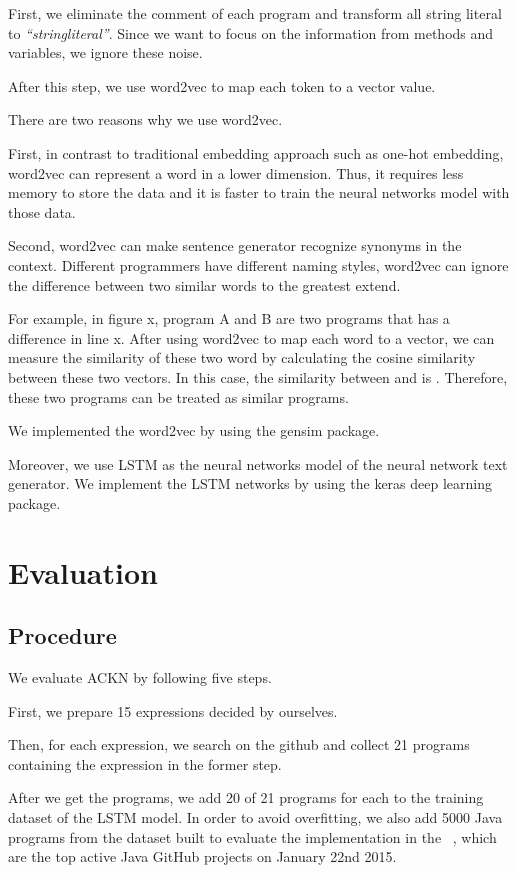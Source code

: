 \documentclass[PRO,english]{ipsj}
\begin{document}
First, we eliminate the comment of each program and transform all string literal to \textit{``stringliteral''}. Since we want to focus on the information from methods and variables, we ignore these noise.

After this step, we use word2vec to map each token to a vector value. 

There are two reasons why we use word2vec. 

First, in contrast to traditional embedding approach such as one-hot embedding, word2vec can represent a word in a lower dimension. Thus, it requires less memory to store the data and it is faster to train the neural networks model with those data. 

Second, word2vec can make sentence generator recognize synonyms in the context. Different programmers have different naming styles, word2vec can ignore the difference between two similar words to the greatest extend. 

For example, in figure x, program A and B are two programs that has a difference in line x. After using word2vec to map each word to a vector, we can measure the similarity of these two word by calculating the cosine similarity between these two vectors. In this case, the similarity between \texttt{} and \texttt{} is . Therefore, these two programs can be treated as similar programs.

We implemented the word2vec by using the gensim package.

Moreover, we use LSTM as the neural networks model of the neural network text generator. We implement the LSTM networks by using the keras deep learning package.

\section{Evaluation}\label{sec:evaluation}
\subsection{Procedure}
We evaluate ACKN by following five steps. 

First, we prepare 15 expressions decided by ourselves. 

Then, for each expression, we search on the github and collect 21 programs containing the expression in the former step.

After we get the programs, we add 20 of 21 programs for each to the training dataset of the LSTM model. In order to avoid overfitting, we also add 5000 Java programs from the dataset built to evaluate the implementation in the ~\cite{Dataset}, which are the top active Java GitHub projects on January 22nd 2015.
\end{document}
